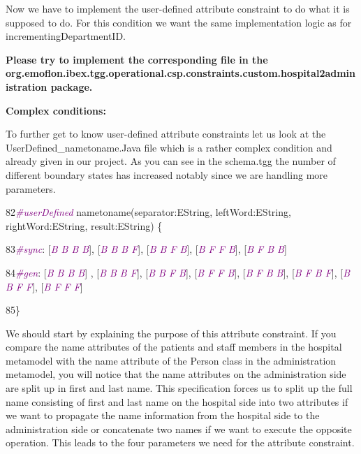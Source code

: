 Now we have to implement the user-defined attribute constraint to do what it is supposed to do.
For this condition we want the same implementation logic as for \textsf{incrementingDepartmentID}.\newline

\textbf{Please try to implement the corresponding file in the \textsf{org.emoflon.ibex.tgg.operational.csp.constraints.custom.hospital2administration} package.} \newline

\textbf{Complex conditions:}

To further get to know user-defined attribute constraints let us look at the \textsf{UserDefined\_nametoname.Java} file which is a rather complex condition and already given in our project. As you can see in the schema.tgg the number of different boundary states has increased notably since we are handling more parameters. \newline

{

82\hspace{0.45cm}\textcolor{Purple}{\textit{\#userDefined}} nametoname(separator:EString, leftWord:EString, rightWord:EString, result:EString) \{

83\hspace{1cm}\textcolor{Purple}{\textit{\#sync}}: [\textcolor{Purple}{\textit{B B B B}}], [\textcolor{Purple}{\textit{B B B F}}], [\textcolor{Purple}{\textit{B B F B}}], [\textcolor{Purple}{\textit{B F F B}}], [\textcolor{Purple}{\textit{B F B B}}]
		
84\hspace{1cm}\textcolor{Purple}{\textit{\#gen}}: [\textcolor{Purple}{\textit{B B B B}}] , [\textcolor{Purple}{\textit{B B B F}}], [\textcolor{Purple}{\textit{B B F B}}], [\textcolor{Purple}{\textit{B F F B}}], [\textcolor{Purple}{\textit{B F B B}}], [\textcolor{Purple}{\textit{B F B F}}], [\textcolor{Purple}{\textit{B B F F}}], [\textcolor{Purple}{\textit{B F F F}}]

85\hspace{0.45cm}\} \newline
	
}

We should start by explaining the purpose of this attribute constraint. If you compare the name attributes of the patients and staff members in the hospital metamodel with the name attribute of the Person class in the administration metamodel, you will notice that the name attributes on the administration side are split up in first and last name. This specification forces us to split up the full name consisting of first and last name on the hospital side into two attributes if we want to propagate the name information from the hospital side to the administration side or concatenate two names if we want to execute the opposite operation. This leads to the four parameters we need for the attribute constraint.

